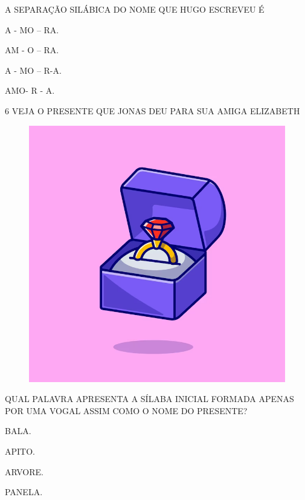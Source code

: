 A SEPARAÇÃO SILÁBICA DO NOME QUE HUGO ESCREVEU É

\begin{escolha}

\item A - MO – RA.

\item AM - O – RA.

\item A - MO – R-A.

\item AMO- R - A.

\end{escolha}

\num{6} VEJA O PRESENTE QUE JONAS DEU PARA SUA AMIGA ELIZABETH

\begin{figure}[H]
\centering
\includegraphics[width=\textwidth]{./media/image224.png}
\end{figure}

QUAL PALAVRA APRESENTA A SÍLABA INICIAL FORMADA APENAS POR UMA VOGAL ASSIM COMO O NOME DO PRESENTE?

\begin{escolha}

\item BALA.

\item APITO.

\item ARVORE.

\item PANELA.

\end{escolha}

